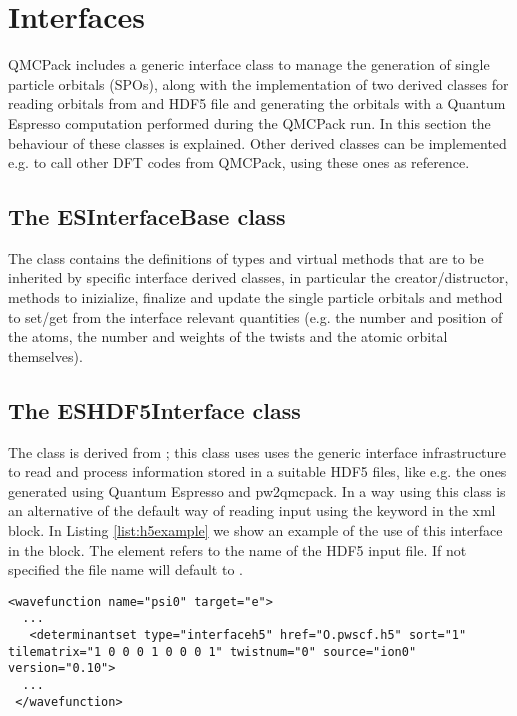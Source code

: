 \section{Interfaces}
\label{sec:interf}
QMCPack includes a generic interface class to manage the generation of single particle orbitals (SPOs), along with the
implementation of two derived classes for reading orbitals from and HDF5 file and generating the orbitals with a Quantum
Espresso computation performed during the QMCPack run. In this section the behaviour of these classes is explained. 
Other derived classes can be implemented e.g. to call other DFT codes from QMCPack, using these ones as reference.

\subsection{The ESInterfaceBase class}
The  class contains the definitions of types and virtual methods that are to be inherited by specific 
interface derived classes, in particular the creator/distructor, methods to inizialize, finalize and update the 
single particle orbitals and method to set/get from the interface relevant quantities (e.g. the number and position 
of the atoms, the number and weights of the twists and the atomic orbital themselves).

\subsection{The ESHDF5Interface class}
The  class is derived from ; this class uses uses the generic interface 
infrastructure to read and process information stored in a suitable HDF5 files, like e.g. the ones generated using 
Quantum Espresso and pw2qmcpack.
In a way using this class is an alternative of the default way of reading input using the keyword  in the  xml block.
In Listing \ref{list:h5example} we show an example of the use of this interface in the  block. The element 
refers to the name of the HDF5 input file. If not specified the file name will default to .
\begin{lstlisting}[style=QMCPXML,caption=Example of \ixml{determinantset} block using the HDF5 interface \label{list:h5example}]
 <wavefunction name="psi0" target="e">
  ...
   <determinantset type="interfaceh5" href="O.pwscf.h5" sort="1" tilematrix="1 0 0 0 1 0 0 0 1" twistnum="0" source="ion0" version="0.10">
  ...
 </wavefunction>
\end{lstlisting}

